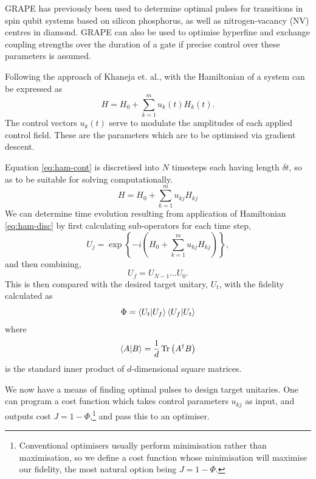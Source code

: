 \documentclass[../Thesis.tex]{subfiles}
\begin{document}
GRAPE has previously been used to determine optimal pulses for transitions in spin qubit systems based on silicon phosphorus\cite{hill_exchange-based_2021}, as well as nitrogen-vacancy (NV) centres in diamond\cite{rong_experimental_2015}. GRAPE can also be used to optimise hyperfine and exchange coupling strengths over the duration of a gate if precise control over these parameters is assumed\cite{tsai_optimal_2009}.

Following the approach of Khaneja et. al., with the Hamiltonian of a  system can be expressed as
\begin{equation}
    H = H_0 + \sum_{k=1}^m u_k(t)H_k(t).
    \label{eq:ham-cont}
\end{equation}
The control vectors $u_k(t)$ serve to modulate the amplitudes of each applied control field. These are the parameters which are to be optimised via gradient descent. 



Equation \ref{eq:ham-cont} is discretised into $N$ timesteps each having length $\delta t$, so as to be suitable for solving computationally. 
\begin{equation}
    H = H_0 + \sum_{k=1}^m u_{kj}H_{kj}
    \label{eq:ham-disc}
\end{equation}
We can determine time evolution resulting from application of Hamiltonian \ref{eq:ham-disc} by first calculating sub-operators for each time step,
\begin{equation}
    U_j = \exp\left\{-i\left(H_0 + \sum_{k=1}^m u_{kj}H_{kj}\right)\right\},
\end{equation}
and then combining,
\begin{equation}
    U_f = U_{N-1}\dots U_0.
\end{equation}
This is then compared with the desired target unitary, $U_t$, with the fidelity calculated as
\begin{equation}
    \Phi = \bra{U_t}\ket{U_f}\bra{U_f}\ket{U_t}
\end{equation}
where 
\begin{equation}
    \bra{A}\ket{B} = \frac{1}{d}\Tr\left(A^\dagger B\right)
\end{equation}
is the standard inner product of $d$-dimensional square matrices.

We now have a means of finding optimal pulses to design target unitaries. One can program a cost function which takes control parameters $u_{kj}$ as input, and outputs cost $J=1-\Phi$,\footnote{Conventional optimisers usually perform minimisation rather than maximisation, so we define a cost function whose minimisation will maximise our fidelity, the most natural option being $J=1-\Phi$.} and pass this to an optimiser. 
\end{document}
